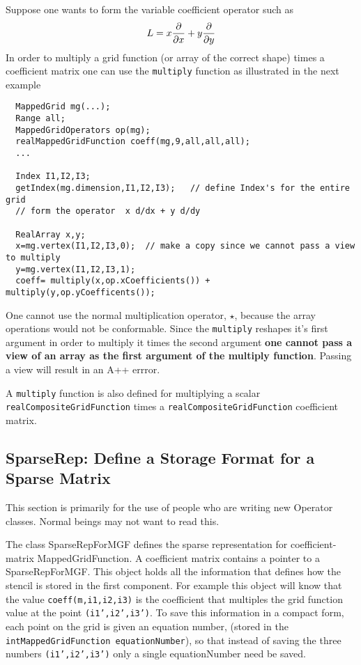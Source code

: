 Suppose one wants to form the variable coefficient operator such as
\[
     L = x {\partial \over \partial x} + y {\partial \over \partial y}
\]
In order to multiply a grid function (or array of the correct shape) 
times a coefficient matrix one can
use the {\tt multiply} function as illustrated in the next example
\begin{verbatim}
  MappedGrid mg(...);
  Range all;
  MappedGridOperators op(mg);
  realMappedGridFunction coeff(mg,9,all,all,all);
  ...
  
  Index I1,I2,I3;
  getIndex(mg.dimension,I1,I2,I3);   // define Index's for the entire grid
  // form the operator  x d/dx + y d/dy

  RealArray x,y;
  x=mg.vertex(I1,I2,I3,0);  // make a copy since we cannot pass a view to multiply
  y=mg.vertex(I1,I2,I3,1);
  coeff= multiply(x,op.xCoefficients()) + multiply(y,op.yCoefficents());

\end{verbatim}
One cannot use the normal multiplication operator, $\star$, because the array operations would not be conformable.
Since the {\tt multiply} reshapes it's first argument in order to multiply it times the second argument
{\bf one cannot pass a view of an array as the first argument of the multiply function}. Passing a view will
result in an A++ errror.

A {\tt multiply} function is also defined for multiplying a scalar {\tt realCompositeGridFunction} times
a {\tt realCompositeGridFunction} coefficient matrix.



\subsection{SparseRep: Define a Storage Format for a Sparse Matrix} \label{SparseRep}

This section is primarily for the use of people who are writing new Operator classes.
Normal beings may not want to read this.


The class {\ff SparseRepForMGF} defines the sparse representation for coefficient-matrix
MappedGridFunction. 
A coefficient matrix contains a pointer to a {\ff SparseRepForMGF}. This 
object holds all the information that defines how the stencil is stored
in the first component. For example this object will know that the
value {\tt coeff(m,i1,i2,i3)} is the coefficient that multiples the
grid function value at the point {\tt (i1',i2',i3')}. 
To save this information in a compact form, each point on the grid is given
an equation number, (stored in the {\tt intMappedGridFunction equationNumber}),
 so that instead of saving the three numbers {\tt (i1',i2',i3')} 
only a single equationNumber need be saved. 

